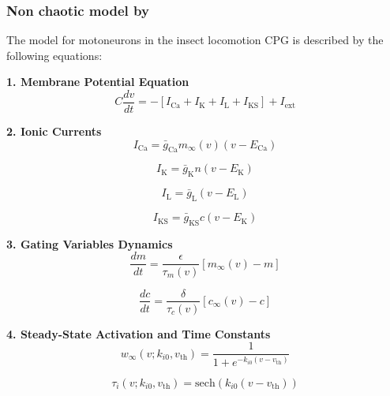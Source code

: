 \subsubsection{Non chaotic model by \textcite{ghigliazza_minimal_2004b}}
The \textcite{ghigliazza_minimal_2004b} model for motoneurons in the insect locomotion CPG is described by the following equations:

\textbf{1. Membrane Potential Equation}
\begin{equation}
C \frac{dv}{dt} = -[I_{\text{Ca}} + I_{\text{K}} + I_{\text{L}} + I_{\text{KS}}] + I_{\text{ext}}
\end{equation}

\textbf{2. Ionic Currents}
\begin{equation}
I_{\text{Ca}} = \bar{g}_{\text{Ca}} m_{\infty}(v) (v - E_{\text{Ca}})
\end{equation}

\begin{equation}
I_{\text{K}} = \bar{g}_{\text{K}} n (v - E_{\text{K}})
\end{equation}

\begin{equation}
I_{\text{L}} = \bar{g}_{\text{L}} (v - E_{\text{L}})
\end{equation}

\begin{equation}
I_{\text{KS}} = \bar{g}_{\text{KS}} c (v - E_{\text{K}})
\end{equation}

\textbf{3. Gating Variables Dynamics}
\begin{equation}
\frac{dm}{dt} = \frac{\epsilon}{\tau_m(v)} [m_{\infty}(v) - m]
\end{equation}

\begin{equation}
\frac{dc}{dt} = \frac{\delta}{\tau_c(v)} [c_{\infty}(v) - c]
\end{equation}

\textbf{4. Steady-State Activation and Time Constants}
\begin{equation}
w_{\infty}(v; k_{i0}, v_{\text{th}}) = \frac{1}{1 + e^{-k_{i0} (v - v_{\text{th}})}}
\end{equation}

\begin{equation}
\tau_i(v; k_{i0}, v_{\text{th}}) = \text{sech}(k_{i0}(v - v_{\text{th}}))
\end{equation}

